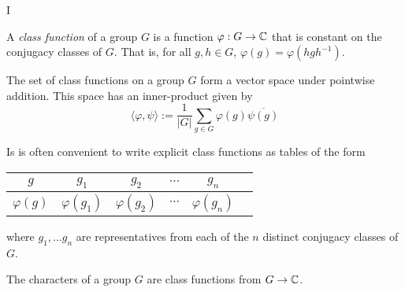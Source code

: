 



I

\begin{definition}
    A \emph{class function} of a group $G$ is a function $\varphi : G \rightarrow \mathbb{C}$ that is constant on the 
    conjugacy classes of $G$. That is, for all $g,h \in G$, $\varphi(g) = \varphi(hgh^{-1})$.
    
    The set of class functions on a group $G$ form a vector space under pointwise addition. This space has an 
    inner-product given by
    \[
        \langle \varphi, \psi \rangle := \frac{1}{|G|} \sum_{g \in G} \varphi(g)\overline{\psi(g)}
    \]
\end{definition}


Is is often convenient to write explicit class functions as tables of the form 

\begin{center}
\begin{tabular}{c|ccccc}
    $g$ & $g_1$ & $g_2$ & $\cdots$ & $g_n$  \\ \hline
    $\varphi(g)$ & $\varphi(g_1)$ & $\varphi(g_2)$ & $\cdots$ & $\varphi(g_n)$
\end{tabular}
\end{center}
where $g_1, ... g_n$ are representatives from each of the $n$ distinct conjugacy classes of $G$.




\begin{theorem}
    The characters of a group $G$ are class functions from $G \rightarrow \mathbb{C}$.
\end{theorem}

